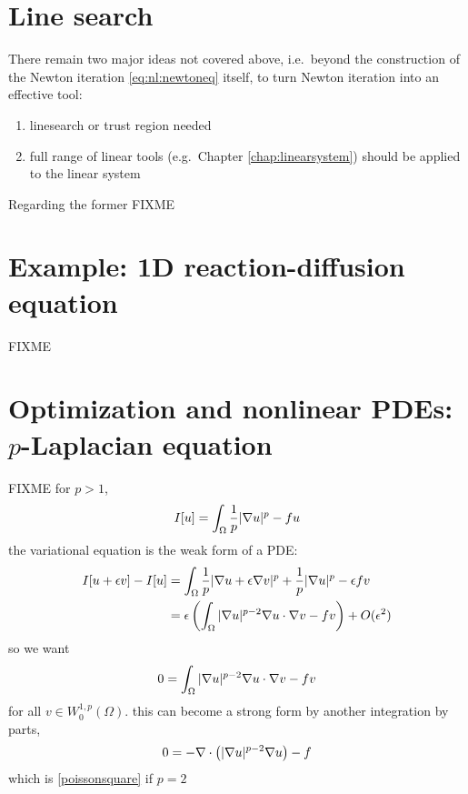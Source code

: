 \section{Line search}

There remain two major ideas not covered above, i.e.~beyond the construction of the Newton iteration \eqref{eq:nl:newtoneq} itself, to turn Newton iteration into an effective tool:
\renewcommand{\labelenumi}{\roman{enumi})}
\begin{enumerate}
\item linesearch or trust region needed \citep{Kelley2003}
\item full range of linear tools (e.g.~Chapter \ref{chap:linearsystem}) should be applied to the linear system
\end{enumerate}

Regarding the former FIXME


\section{Example: 1D reaction-diffusion equation}

FIXME

\vfill
{}



\section{Optimization and nonlinear PDEs: $p$-Laplacian equation}

FIXME for $p>1$,
    $$I[u] = \int_\Omega \frac{1}{p} |\nabla u|^p - fu$$
the variational equation is the weak form of a PDE:
\begin{align*}
I[u+\epsilon v] - I[u] &= \int_\Omega \frac{1}{p} |\nabla u + \epsilon \nabla v|^p + \frac{1}{p} |\nabla u|^p - \epsilon f v \\
   &= \epsilon \left(\int_\Omega |\nabla u|^{p-2} \nabla u \cdot \nabla v - f v\right) + O(\epsilon^2)
\end{align*}
so we want
    $$0 = \int_\Omega |\nabla u|^{p-2} \nabla u \cdot \nabla v - f v$$
for all $v \in W^{1,p}_0(\Omega)$.  this can become a strong form by another integration by parts,
    $$0 = - \nabla\cdot\left(|\nabla u|^{p-2} \nabla u\right) - f$$
which is \eqref{poissonsquare} if $p=2$

